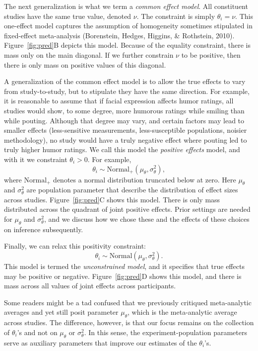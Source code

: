 \documentclass[english,man]{apa6}
\theoremstyle{definition}
\theoremstyle{definition}
\theoremstyle{definition}
\theoremstyle{remark}
\begin{document}
The next generalization is what we term a \emph{common effect model}.
All constituent studies have the same true value, denoted \(\nu\). The
constraint is simply \(\theta_i=\nu\). This one-effect model captures
the assumption of homogeneity sometimes stipulated in fixed-effect
meta-analysis (Borenstein, Hedges, Higgins, \& Rothstein, 2010).
Figure~\ref{fig:pred}B depicts this model. Because of the equality
constraint, there is mass only on the main diagonal. If we further
constrain \(\nu\) to be positive, then there is only mass on positive
values of this diagonal.

A generalization of the common effect model is to allow the true effects
to vary from study-to-study, but to stipulate they have the same
direction. For example, it is reasonable to assume that if facial
expression affects humor ratings, all studies would show, to some
degree, more humorous ratings while smiling than while pouting. Although
that degree may vary, and certain factors may lead to smaller effects
(less-sensitive measurements, less-susceptible populations, noisier
methodology), no study would have a truly negative effect where pouting
led to truly higher humor ratings. We call this model the \emph{positive
effects} model, and with it we constraint \(\theta_i>0\). For example,
\[
\theta_i \sim \mbox{Normal}_+(\mu_\theta,\sigma^2_\theta),
\] where \(\mbox{Normal}_+\) denotes a normal distribution truncated
below at zero. Here \(\mu_\theta\) and \(\sigma^2_\theta\) are
population parameter that describe the distribution of effect sizes
across studies. Figure~\ref{fig:pred}C shows this model. There is only
mass distributed across the quadrant of joint positive effects. Prior
settings are needed for \(\mu_\theta\) and \(\sigma^2_\theta\), and we
discuss how we chose these and the effects of these choices on inference
subsequently.

Finally, we can relax this positivity constraint: \[
\theta_i \sim \mbox{Normal}(\mu_\theta,\sigma^2_\theta).
\] This model is termed the \emph{unconstrained model}, and it specifies
that true effects may be positive or negative. Figure~\ref{fig:pred}D
shows this model, and there is mass across all values of joint effects
across participants.

Some readers might be a tad confused that we previously critiqued
meta-analytic averages and yet still posit parameter \(\mu_\theta\),
which is the meta-analytic average across studies. The difference,
however, is that our focus remains on the collection of \(\theta_i\)'s
and not on \(\mu_\theta\) or \(\sigma^2_\theta\). In this sense, the
experiment-population parameters serve as auxiliary parameters that
improve our estimates of the \(\theta_i\)'s.
\end{document}
